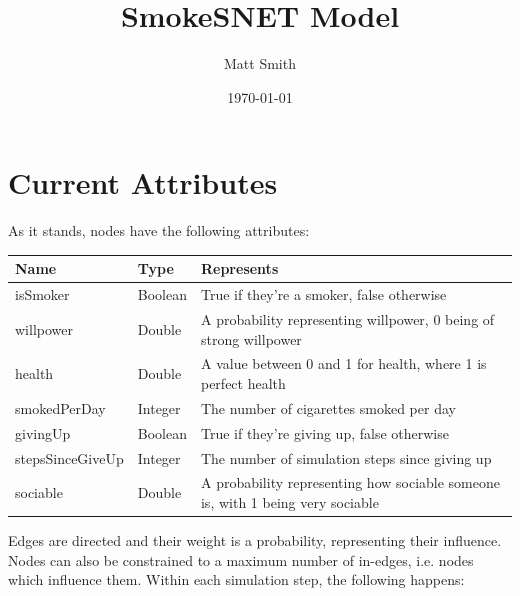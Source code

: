 \documentclass[]{article}
\begin{document}
\title{SmokeSNET Model}
\author{Matt Smith}
\date{\today}
\maketitle

\section{Current Attributes}
As it stands, nodes have the following attributes:
\begin{table}[h]
    \begin{tabular}{|l|l|l|}
        \hline
        Name & Type & Represents \\ \hline
        	isSmoker &  Boolean & True if they're a smoker, false otherwise \\ 
 	willpower &  Double & A probability representing willpower, 0 being of strong willpower \\ 
	health &  Double & A value between 0 and 1 for health, where 1 is perfect health \\ 
	smokedPerDay &  Integer & The number of cigarettes smoked per day\\ 
 	givingUp &  Boolean & True if they're giving up, false otherwise \\ 
 	stepsSinceGiveUp &  Integer & The number of simulation steps since giving up \\ 
	sociable &  Double & A probability representing how sociable someone is, with 1 being very sociable \\ 
        \hline
    \end{tabular}
\end{table}
Edges are directed and their weight is a probability, representing their influence.
Nodes can also be constrained to a maximum number of in-edges, i.e. nodes which influence them. Within each simulation step, the following happens:
\end{document}

